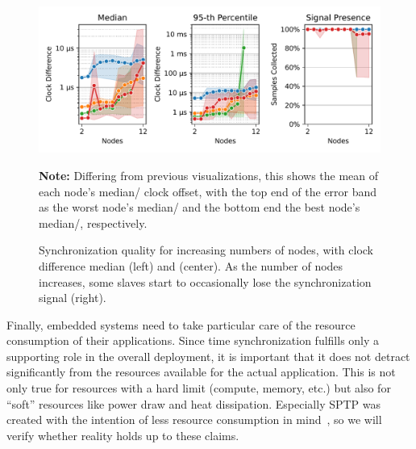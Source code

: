 \begin{figure}
\begin{center}
\includegraphics[width=\linewidth]{res/generated/resource_consumption/summary_quality_trend.pdf}
\legend
\end{center}

\parbox{\linewidth}{\footnotesize {\bfseries Note:} Differing from previous visualizations, this shows the mean of each node's median/\PNineFive{} clock offset, with the top end of the error band as the worst node's median/\PNineFive{} and the bottom end the best node's median/\PNineFive{}, respectively.}
\caption{Synchronization quality for increasing numbers of nodes, with clock difference median (left) and \PNineFive{} (center). As the number of nodes increases, some slaves start to occasionally lose the synchronization signal (right).}
\label{fig:resource_consumption_quality}
\end{figure}


Finally, embedded systems need to take particular care of the resource consumption of their applications. Since time synchronization fulfills only a supporting role in the overall deployment, it is important that it does not detract significantly from the resources available for the actual application. This is not only true for resources with a hard limit (compute, memory, etc.) but also for ``soft'' resources like power draw and heat dissipation. Especially SPTP was created with the intention of less resource consumption in mind~\cite{sptp}, so we will verify whether reality holds up to these claims.

